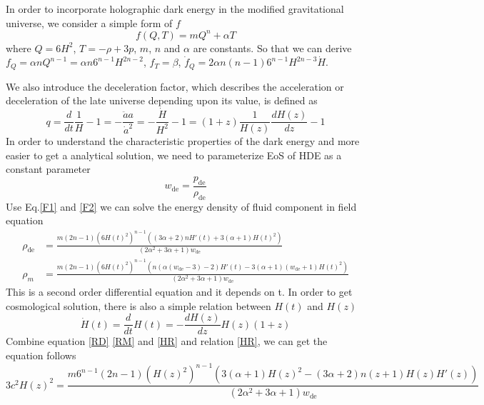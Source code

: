 \documentclass[preprint]{aastex631}
\begin{document}
In order to incorporate holographic dark energy in the modified gravitational universe, we consider a simple form of $f$ 
\begin{equation}
    f(Q,T)=m Q^n+\alpha T
\end{equation}
where $Q=6H^2$, $T=-\rho+3p$, $m$, $n$ and $\alpha$ are constants. So that we can derive $f_Q=\alpha n Q^{n-1}=\alpha n 6^{n-1}H^{2n-2}$, $f_T=\beta$, $\dot{f}_Q=2\alpha n(n-1)6^{n-1}H^{2n-3}\dot{H}$.

We also introduce the deceleration factor, which describes the acceleration or deceleration of the late universe depending upon its value, is defined as
\begin{equation}
    q=\frac{d}{dt}\frac{1}{H}-1=-\frac{\ddot{a}a}{\dot{a}^2}=-\frac{\dot{H}}{H^2}-1=(1+z)\frac{1}{H(z)}\frac{dH(z)}{dz}-1   
\end{equation}
In order to understand the characteristic properties of the dark energy and more easier to get a analytical solution, we need to parameterize EoS of HDE as a constant parameter
\begin{equation}
    w_\text{de}=\frac{p_\text{de}}{\rho_\text{de}}
\end{equation}
Use Eq.\eqref{F1} and \eqref{F2} we can solve the energy density of fluid component in field equation
\begin{align}
    \rho_\text{de}&= \frac{m (2 n-1) \left(6H(t)^2\right)^{n-1} \left((3 \alpha +2) n H'(t)+3 (\alpha +1) H(t)^2\right)}{\left(2 \alpha ^2+3 \alpha +1\right) w_\text{de}} \label{RD}\\
    \rho_m&= \frac{m (2 n-1) \left(6H(t)^2\right)^{n-1} \left(n (\alpha  (w_\text{de}-3)-2) H'(t)-3 (\alpha +1) (w_\text{de}+1) H(t)^2\right)}{\left(2 \alpha ^2+3 \alpha +1\right) w_\text{de}}\label{RM}
\end{align}
This is a second order differential equation and it depends on t. In order to get cosmological solution, there is also a simple relation between $H(t)$ and $H(z)$
\begin{equation}
    \dot{H}(t)=\frac{d}{dt}H(t)=-\frac{d H(z)}{dz}H(z)(1+z)\label{HR}
\end{equation}
Combine equation \eqref{RD} \eqref{RM} and \eqref{HR} and relation \eqref{HR}, we can get the equation follows
\begin{equation}
    3 c^2 H(z)^2=\frac{m 6^{n-1} (2 n-1) \left(H(z)^2\right)^{n-1} \left(3 (\alpha +1) H(z)^2-(3 \alpha +2) n (z+1) H(z) H'(z)\right)}{\left(2 \alpha ^2+3 \alpha +1\right) {w_\text{de}}}
\end{equation}
\end{document}

